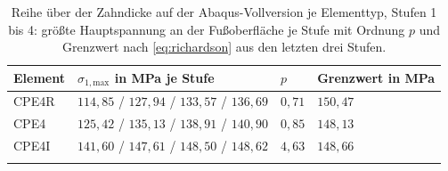 \begin{table}[htbp]
    \caption{Reihe über der Zahndicke auf der Abaqus-Vollversion je Elementtyp, Stufen 1 bis 4: größte Hauptspannung an der Fußoberfläche je Stufe mit Ordnung $p$ und Grenzwert nach \eqref{eq:richardson} aus den letzten drei Stufen.}
    \label{tab:anhang_elementtypen_grenzwerte}
    \centering
    \footnotesize
    \setlength{\tabcolsep}{4pt}
    \begin{tabular}{lL{6.0cm}ll}
        Element & $\sigma_{\mathrm{1,max}}$ in MPa je Stufe & $p$ & Grenzwert in MPa \\
        \hline
        CPE4R & $114{,}85$ / $127{,}94$ / $133{,}57$ / $136{,}69$ & $0{,}71$ & $150{,}47$ \\
        \hline
        CPE4 & $125{,}42$ / $135{,}13$ / $138{,}91$ / $140{,}90$ & $0{,}85$ & $148{,}13$ \\
        \hline
        CPE4I & $141{,}60$ / $147{,}61$ / $148{,}50$ / $148{,}62$ & $4{,}63$ & $148{,}66$ \\
        \hline
    \end{tabular}
\end{table}
